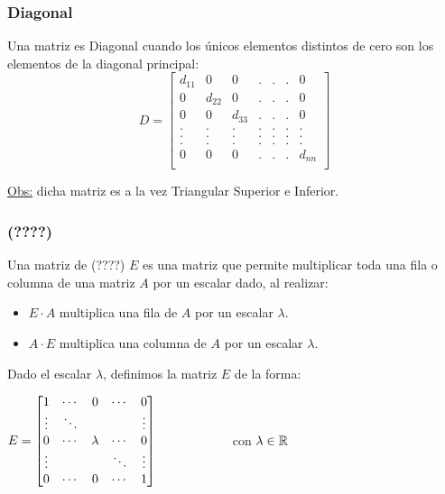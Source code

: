 \subsubsection{Diagonal}
Una matriz es Diagonal cuando los únicos elementos distintos de cero son los elementos
de la diagonal principal:
\begin{equation*}
	D =
	\left [ \begin{array}{ccccccc}
	  d_{11} & 0 & 0 & . & . & .& 0\\
	  0 & d_{22} & 0 & . & . & .& 0\\
	  0 & 0 & d_{33} & . & . & .& 0\\
	  . & . & . & . & . & .& .\\
	  . & . & . & . & . & .& .\\
	  . & . & . & . & . & .& .\\
	  0 & 0 & 0 & . & . & .& d_{nn}\\
	\end{array} \right ]
\end{equation*}

\underline{Obs:} dicha matriz es a la vez Triangular Superior e Inferior.

\subsubsection{(????)}

Una matriz de (????) $E$ es una matriz que permite multiplicar toda una fila o columna de una matriz $A$ por un escalar dado, al realizar:
\begin{itemize}
	\item $E\cdot A$ multiplica una fila de $A$ por un escalar $\lambda$.
	\item $A\cdot E$ multiplica una columna de $A$ por un escalar $\lambda$.
\end{itemize}

Dado el escalar $\lambda$, definimos la matriz $E$ de la forma:
\begin{center}
	$E=\begin{bmatrix}
		1 & \cdots & 0 & \cdots & 0 \\
		\vdots  & \ddots &   &        & \vdots  \\
		0 & \cdots & \lambda & \cdots & 0\\
		\vdots & & &\ddots & \vdots \\
		0&\cdots & 0 & \cdots & 1
	\end{bmatrix} \hspace{2cm}$ con $\lambda\in\mathbb{R}$
\end{center}



